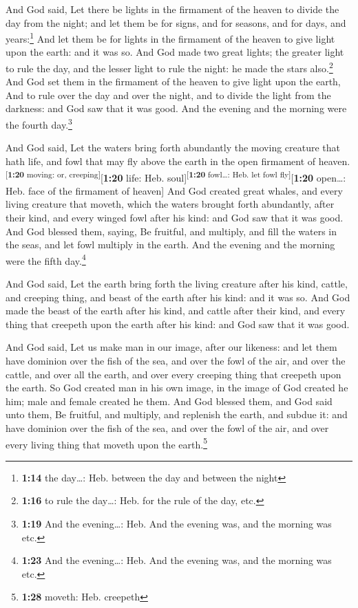  And God said, Let there be lights in the firmament of
the heaven to divide the day from the night; and let them be for signs,
and for seasons, and for days, and years:\footnote{\textbf{1:14} the
  day\ldots: Heb. between the day and between the night} 
And let them be for lights in the firmament of the heaven to give light
upon the earth: and it was so.  And God made two great
lights; the greater light to rule the day, and the lesser light to rule
the night: he made the stars also.\footnote{\textbf{1:16} to rule the
  day\ldots: Heb. for the rule of the day, etc.}  And God
set them in the firmament of the heaven to give light upon the earth,
 And to rule over the day and over the night, and to
divide the light from the darkness: and God saw that it was good.
 And the evening and the morning were the fourth
day.\footnote{\textbf{1:19} And the evening\ldots: Heb. And the evening
  was, and the morning was etc.}

 And God said, Let the waters bring forth abundantly the
moving creature that hath life, and fowl that may fly above the earth in
the open firmament of heaven.\textsuperscript{{[}\textbf{1:20} moving:
or, creeping{]}}{[}\textbf{1:20} life: Heb.
soul{]}\textsuperscript{{[}\textbf{1:20} fowl\ldots: Heb. let fowl
fly{]}}{[}\textbf{1:20} open\ldots: Heb. face of the firmament of
heaven{]}  And God created great whales, and every living
creature that moveth, which the waters brought forth abundantly, after
their kind, and every winged fowl after his kind: and God saw that it
was good.  And God blessed them, saying, Be fruitful, and
multiply, and fill the waters in the seas, and let fowl multiply in the
earth.  And the evening and the morning were the fifth
day.\footnote{\textbf{1:23} And the evening\ldots: Heb. And the evening
  was, and the morning was etc.}

 And God said, Let the earth bring forth the living
creature after his kind, cattle, and creeping thing, and beast of the
earth after his kind: and it was so.  And God made the
beast of the earth after his kind, and cattle after their kind, and
every thing that creepeth upon the earth after his kind: and God saw
that it was good.

 And God said, Let us make man in our image, after our
likeness: and let them have dominion over the fish of the sea, and over
the fowl of the air, and over the cattle, and over all the earth, and
over every creeping thing that creepeth upon the earth. 
So God created man in his own image, in the image of God created he him;
male and female created he them.  And God blessed them,
and God said unto them, Be fruitful, and multiply, and replenish the
earth, and subdue it: and have dominion over the fish of the sea, and
over the fowl of the air, and over every living thing that moveth upon
the earth.\footnote{\textbf{1:28} moveth: Heb. creepeth}

